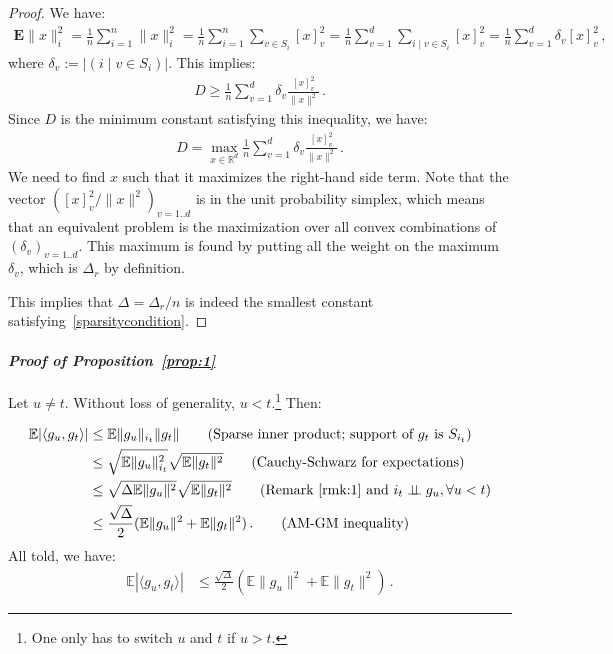 \documentclass[twoside, 11pt]{article}
\newcommand{\sparsity}{\Delta}
\newcommand{\sparsityr}{\Delta_r}
\newcommand{\E}{\mathbb{E}}
\newcommand{\Econd}{\mathbf{E}}
\begin{document}
\begin{proof}
	We have:
	\begin{align}
	\Econd \|x\|_i^2 = \frac{1}{n} \sum_{i=1}^n \|x\|_i^2
	= \frac{1}{n} \sum_{i=1}^n \sum_{v \in S_i} [x]_v^2
	= \frac{1}{n} \sum_{v=1}^d \sum_{i \mid v \in S_i} [x]_v^2
	= \frac{1}{n} \sum_{v=1}^d \delta_v [x]_v^2 \, ,
	\end{align}
	where $\delta_v := |(i \mid v \in S_i)|$.
	This implies:
	\begin{align}
	D \geq \frac{1}{n} \sum_{v=1}^d \delta_v \frac{[x]_v^2}{\|x\|^2}  \, .
	\end{align}
	Since $D$ is the minimum constant satisfying this inequality, we have:
	\begin{align}
	D = \max_{x \in \mathbb{R}^d} \frac{1}{n} \sum_{v=1}^d \delta_v \frac{[x]_v^2}{\|x\|^2}  \, .
	\end{align}
	We need to find $x$ such that it maximizes the right-hand side term.
	Note that the vector $([x]_v^2 / \|x\|^2)_{v=1..d}$ is in the unit probability simplex, which means that an equivalent problem is the maximization over all convex combinations of $(\delta_v)_{v=1..d}$.
	This maximum is found by putting all the weight on the maximum $\delta_v$, which is $\sparsityr$ by definition.

	This implies that $\sparsity = \sparsityr / n$ is indeed the smallest constant satisfying~\eqref{sparsitycondition}.
\end{proof}

\paragraph{\textit{Proof of Proposition~\ref{prop:1}}}

Let $u \neq t$. Without loss of generality, $u < t$.\footnote{One only has to switch $u$ and $t$ if $u>t$.}
Then:

\begin{align}
\E |\langle g_{u}, g_t \rangle |
&\leq \E\|g_{u}\|_{i_t}\|g_t\|
\tag*{(Sparse inner product; support of $g_t$ is $S_{i_t}$)} \nonumber \\
&\leq \sqrt{\E\|g_{u}\|_{i_t}^2}\sqrt{\E\|g_{t}\|^2}
\tag*{(Cauchy-Schwarz for expectations)} \nonumber \\
&\leq \sqrt{\sparsity \E\|g_{u}\|^2}\sqrt{\E\|g_{t}\|^2}
\tag*{(Remark~\ref{rmk:1} and $i_t \perp\!\!\!\perp g_u, \forall u < t$)} \nonumber \\
&\leq \frac{\sqrt{\sparsity}}{2}(\E\|g_{u}\|^2 + \E\|g_{t}\|^2)  \, .
\tag*{(AM-GM inequality)}
\end{align}
All told, we have:
\begin{align}
\E |\langle g_{u}, g_t \rangle | &\leq \frac{\sqrt{\sparsity}}{2}(\E\|g_{u}\|^2 + \E\|g_{t}\|^2)  \, .
\end{align}
\end{document}
